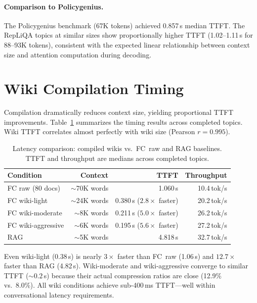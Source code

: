 \documentclass{article}
\begin{document}
\paragraph{Comparison to Policygenius.}
The Policygenius benchmark (67K tokens) achieved 0.857\,s median TTFT.
The RepLiQA topics at similar sizes show proportionally higher TTFT
(1.02--1.11\,s for 88--93K tokens), consistent with the expected linear
relationship between context size and attention computation during
decoding.

\section{Wiki Compilation Timing}
\label{app:wiki_timing}

Compilation dramatically reduces context size, yielding proportional TTFT
improvements. Table~\ref{tab:wiki_timing} summarizes the timing results
across completed topics. Wiki TTFT correlates almost perfectly with wiki
size (Pearson $r = 0.995$).

\begin{table}[t]
\centering
\caption{Latency comparison: compiled wikis vs.\ FC~raw and RAG baselines.
TTFT and throughput are medians across completed topics.}
\label{tab:wiki_timing}
\begin{tabular}{lrrr}
\toprule
\textbf{Condition} & \textbf{Context} & \textbf{TTFT} & \textbf{Throughput} \\
\midrule
FC raw (80 docs)   & ${\sim}$70K words & 1.060\,s              & 10.4\,tok/s \\
FC wiki-light      & ${\sim}$24K words & 0.380\,s ($2.8\times$ faster) & 20.2\,tok/s \\
FC wiki-moderate   & ${\sim}$8K words  & 0.211\,s ($5.0\times$ faster) & 26.2\,tok/s \\
FC wiki-aggressive & ${\sim}$6K words  & 0.195\,s ($5.6\times$ faster) & 27.2\,tok/s \\
RAG                & ${\sim}$5K words  & 4.818\,s              & 32.7\,tok/s \\
\bottomrule
\end{tabular}
\end{table}

Even wiki-light (0.38\,s) is nearly $3\times$ faster than FC~raw (1.06\,s)
and $12.7\times$ faster than RAG (4.82\,s). Wiki-moderate and
wiki-aggressive converge to similar TTFT (${\sim}0.2$\,s) because their
actual compression ratios are close (12.9\% vs.\ 8.0\%). All wiki
conditions achieve sub-400\,ms TTFT---well within conversational latency
requirements.
\end{document}
